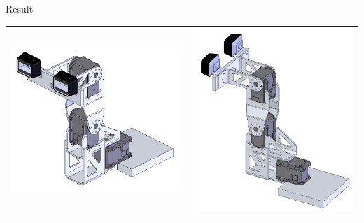 \documentclass{beamer}
\begin{document}
\begin{frame}{Result}

\begin{center}
	\begin{tabular}{ c c }
		  \includegraphics[width=\textwidth,height=0.45\textheight,keepaspectratio]{images/robot_3d_front.pdf} & 
		  \includegraphics[width=\textwidth,height=0.5\textheight,keepaspectratio]{images/robot_3d_side.pdf} 
	\end{tabular}
\end{center}



\end{frame}
\end{document}
